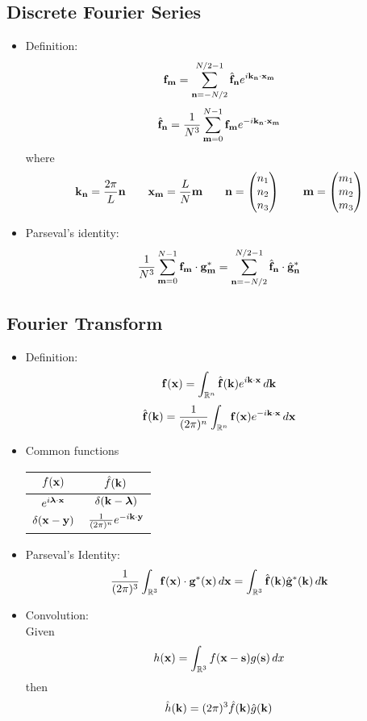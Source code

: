 \documentclass[11pt]{article}
\begin{document}
\subsection{Discrete Fourier Series}
\begin{itemize}
\item Definition:
\[\mathbf{f}_{\mathbf{m}} = \sum_{\mathbf{n}=-N/2}^{N/2-1} \hat{\mathbf{f}}_{\mathbf{n}} e^{i \mathbf{k}_{\mathbf{n}} \cdot \mathbf{x}_{\mathbf{m}}}\]
\[\hat{\mathbf{f}}_{\mathbf{n}} =\frac{1}{N^3}\sum_{\mathbf{m}=0}^{N-1} \mathbf{f}_{\mathbf{m}} e^{-i \mathbf{k}_{\mathbf{n}} \cdot \mathbf{x}_{\mathbf{m}}}\]
 where 
 \[ \mathbf{k}_{\mathbf{n}} = \frac{2 \pi}{L} \mathbf{n} \qquad \mathbf{x}_{\mathbf{m}} = \frac{L}{N}\mathbf{m} \qquad \mathbf{n} = \begin{pmatrix} n_1 \\ n_2 \\ n_3 \end{pmatrix} \qquad \mathbf{m} = \begin{pmatrix} m_1 \\ m_2 \\m_3 \end{pmatrix} \]
 
 \item Parseval's identity:
 \[ \frac{1}{N^3} \sum_{\mathbf{m}=0}^{N-1} \mathbf{f}_{\mathbf{m}} \cdot \mathbf{g}^*_{\mathbf{m}} = \sum_{\mathbf{n}=-N/2}^{N/2-1} \hat{ \mathbf{f} }_{\mathbf{n}} \cdot \hat{ \mathbf{g} }^*_{\mathbf{n}} \]
 \end{itemize}
 
\subsection{Fourier Transform}
\begin{itemize}
\item Definition:
\[\mathbf{f}(\mathbf{x}) = \int_{{\mathbb{R}^n}} \hat{\mathbf{f}}(\mathbf{k})e^{i\mathbf{k} \cdot \mathbf{x}} \,d\mathbf{k} \]
\[\hat{\mathbf{f}}(\mathbf{k}) = \frac{1}{(2\pi)^n}\int_{{\mathbb{R}^n}} \mathbf{f}(\mathbf{x})e^{-i\mathbf{k} \cdot \mathbf{x}} \,d\mathbf{x}\]

\item Common functions
\begin{center}
\begin{tabular}{|c|c|}
\hline
$f(\mathbf{x})$ & $\hat{f}(\mathbf{k})$ \\
\hline
$e^ {i \boldsymbol{\lambda} \cdot \mathbf{x}}$ & $\delta(\mathbf{k} - \boldsymbol{\lambda})$ \\
\hline
$\delta(\mathbf{x} - \mathbf{y})$ & $\frac{1}{(2\pi)^n}e^{- i \mathbf{k} \cdot \mathbf{y}} $ \\
\hline
\end{tabular}	
\end{center}

\item Parseval's Identity:
\[ \frac{1}{ ( 2 \pi )^3 } \int_{\mathbb{R}^3} \mathbf{f}(\mathbf{x}) \cdot \mathbf{g}^*(\mathbf{x}) \,d\mathbf{x} =  \int_{\mathbb{R}^3} \hat {\mathbf{f}}(\mathbf{k}) \hat {\mathbf{g}}^*(\mathbf{k}) \,d\mathbf{k} \]

\item Convolution: \\
Given
\[ h( \mathbf{x} ) = \int_{{\mathbb{R}^3}} f( \mathbf{x} - \mathbf{s} )g( \mathbf{s} ) \, dx \]
then
\[\hat{h}(\mathbf{k}) = (2\pi)^3 \hat{f}(\mathbf{k}) \hat{g}(\mathbf{k}) \]

\end{itemize}
\end{document}
